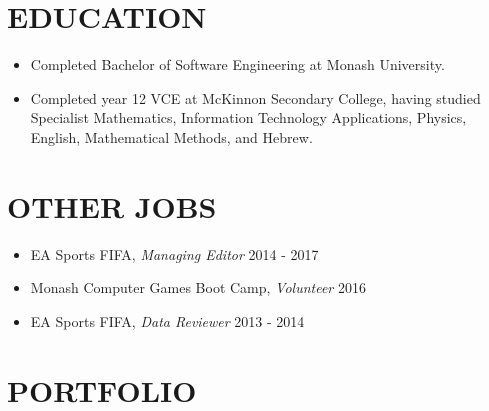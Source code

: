 \documentclass[margin, 11pt]{res} %
\begin{document}
\begin{resume}
\begin{itemize}
\end{itemize}



\section{EDUCATION}

\begin{itemize}

\item Completed Bachelor of Software Engineering at Monash University. %
\item Completed year 12 VCE at McKinnon Secondary College, having studied Specialist  Mathematics, Information Technology Applications, Physics, English, Mathematical Methods, and Hebrew.

\end{itemize}


\section{OTHER JOBS} 

\begin{itemize} \itemsep -11pt

\item EA Sports FIFA, {\sl Managing Editor} \hfill 2014 - 2017\\
\item Monash Computer Games Boot Camp, {\sl Volunteer} \hfill 2016 \\
\item EA Sports FIFA, {\sl Data Reviewer} \hfill 2013 - 2014 \\
 
\end{itemize}




\section{PORTFOLIO} 


\end{resume}
\end{document}
